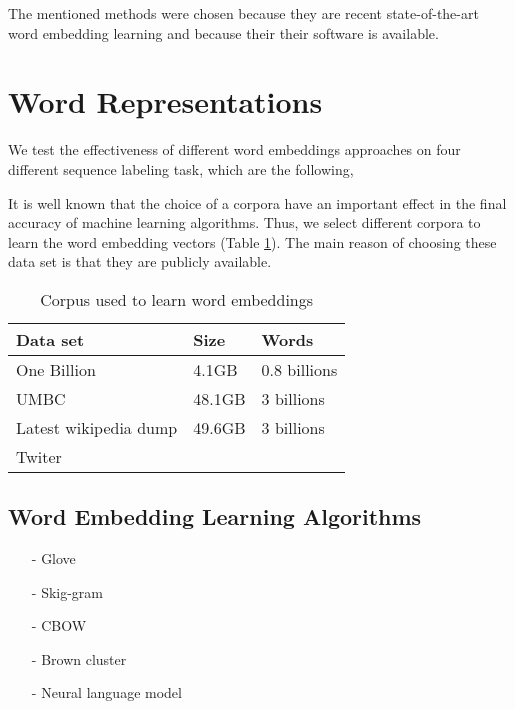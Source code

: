 \documentclass[11pt]{article}
\begin{document}
The mentioned methods were chosen because they are recent state-of-the-art word embedding learning and because their their software is available.



\section{Word Representations}
We test the effectiveness of different word embeddings approaches on four different sequence labeling task, which are the following, 




It is well known that the choice of a corpora have an important effect in the final accuracy of machine learning algorithms. 
Thus, we select different corpora to learn the word embedding vectors (Table \ref{corpus}).
The main reason of choosing these data set is that they are publicly available. 


\begin{table}[h]
\begin{center}
\begin{small}
\begin{tabular}{lll}
\hline
\textbf{Data set} & \textbf{Size} & \textbf{Words} \\ \hline
One Billion 	& 4.1GB & 0.8 billions  \\
UMBC 	& 48.1GB & 3 billions \\
Latest wikipedia dump & 49.6GB & 3 billions \\
Twiter & &  \\ \hline
\end{tabular}
\end{small}
\label{corpus}
\caption{Corpus used to learn word embeddings}
\end{center}
\end{table}

\subsection{Word Embedding Learning Algorithms}
\begin{itemize}
\item[-] Glove \cite{pennington2014glove}
\item[-] Skig-gram \cite{Mikolov13}
\item[-] CBOW \cite{Mikolov13}
\item[-] Brown cluster \cite{Brown92class-basedn-gram}
\item[-] Neural language model \cite{Turian10wordrepresentations}
\end{itemize}
\end{document}
